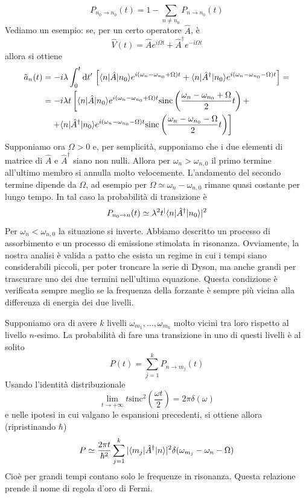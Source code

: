 \documentclass[a4paper, 11pt]{article}
\newcommand{\op}[1]{\hat{#1}}
\renewcommand{\op}[1]{\hat{#1}}
\begin{document}
\[P_{n_0\to n_0}(t)=1-\sum_{n\neq n_0}P_{n\to n_0}(t)\]
Vediamo un esempio: se, per un certo operatore $\op A$, è
\[\op V(t)=\op A e^{i\Omega t}+\op A^\dagger e^{-i\Omega t}\]
allora si ottiene
\begin{align*}
	\tilde a_n(t)&=-i\lambda\int_0^t\d t'\,\left[\braketop{n}{\op A}{n_0}e^{i(\omega_n-\omega_{n_0}+\Omega)t}+\braketop{n}{\op A^\dagger}{n_0}e^{i(\omega_n-\omega_{n_0}-\Omega)t}\right]=\\&=-i\lambda t\left[\braketop{n}{\op A}{n_0}e^{i(\omega_n-\omega_{n_0}+\Omega)t}\mathrm{sinc}\left(\frac{\omega_n-\omega_{n_0}+\Omega}{2}t\right)+\right.\\&\quad\left.+\braketop{n}{\op A^\dagger}{n_0}e^{i(\omega_n-\omega_{n_0}-\Omega)t}\mathrm{sinc}\left(\frac{\omega_n-\omega_{n_0}-\Omega}{2}t\right)\right]
\end{align*}
Supponiamo ora $\Omega>0$ e, per semplicità, supponiamo che i due elementi di matrice di $\op A$ e $\op A^\dagger$ siano non nulli. Allora per $\omega_n>\omega_{n,0}$ il primo termine all'ultimo membro si annulla molto velocemente. L'andamento del secondo termine dipende da $\Omega$, ad esempio per $\Omega\simeq\omega_n-\omega_{n,0}$ rimane quasi costante per lungo tempo. In tal caso la probabilità di transizione è
\[P_{n_0\to n}(t)\simeq\lambda^2t^|\braketop{n}{\op A^\dagger}{n_0}|^2\]
Per $\omega_n<\omega_{n,0}$ la situazione si inverte. Abbiamo descritto un processo di assorbimento e un processo di emissione stimolata in risonanza. Ovviamente, la nostra analisi è valida a patto che esista un regime in cui i tempi siano considerabili piccoli, per poter troncare la serie di Dyson, ma anche grandi per trascurare uno dei due termini nell'ultima equazione. Questa condizione è verificata sempre meglio se la frequenza della forzante è sempre più vicina alla differenza di energia dei due livelli.

Supponiamo ora di avere $k$ livelli $\omega_{m_1},\dots,\omega_{m_k}$ molto vicini tra loro rispetto al livello $n$-esimo. La probabilità di fare una transizione in uno di questi livelli è al solito
\[P(t)=\sum_{j=1}^{k}P_{n\to m_j}(t)\]
Usando l'identità distribuzionale
\[\lim\limits_{t\to+\infty}t\mathrm{sinc}^2\left(\frac{\omega t}{2}\right)=2\pi\delta(\omega)\]
e nelle ipotesi in cui valgano le espansioni precedenti, si ottiene allora (ripristinando $\hbar$)
\[P\simeq\frac{2\pi t}{\hbar^2}\sum_{j=1}^{k}|\braketop{m_j}{\op A^\dagger}{n}|^2\delta(\omega_{m_j}-\omega_n-\Omega)\]
Cioè per grandi tempi contano solo le frequenze in risonanza. Questa relazione prende il nome di regola d'oro di Fermi.
\end{document}
